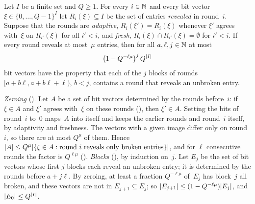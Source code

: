 \begin{lemma}\label{lem:revealing}
Let $I$ be a finite set and $Q\ge1$. For every $i\in\mathbb{N}$ and every bit vector $\xi\in\{0,\dots,Q-1\}^I$ let $R_i(\xi)\subseteq I$
be the set of entries \emph{revealed} in round~$i$. Suppose that the rounds are \emph{adaptive}, $R_i(\xi')=R_i(\xi)$ whenever
$\xi'$ agrees with~$\xi$ on $R_{i'}(\xi)$ for all $i'<i$, and \emph{fresh}, $R_i(\xi)\cap R_{i'}(\xi)=\emptyset$ for $i'<i$. If every
round reveals at most~$\mu$ entries, then for all $a,\ell,j\in\mathbb{N}$ at most
\[
  \bigl(1-Q^{-\ell\mu}\bigr)^j\,Q^{\lvert I \rvert}
\]
bit vectors have the property that each of the $j$ blocks of rounds $[a+b\ell,a+b\ell+\ell)$, $b<j$, contains a round that reveals
an unbroken entry.
\end{lemma}

\begin{outline}
\emph{Zeroing} (). Let $A$ be a set of bit vectors determined by the rounds before~$i$: if $\xi\in
A$ and $\xi'$ agrees with~$\xi$ on these rounds (), then $\xi'\in A$. Setting the bits of round~$i$ to~$0$ maps~$A$
into itself and keeps the earlier rounds and round~$i$ itself, by adaptivity and freshness. The vectors with a given image differ
only on round~$i$, so there are at most $Q^\mu$ of them. Hence $\lvert A \rvert\le Q^\mu\lvert \{\xi\in A:\text{round $i$ reveals only
broken entries}\} \rvert$, and for $\ell$ consecutive rounds the factor is $Q^{\ell\mu}$ ().
\emph{Blocks} (), by induction on~$j$. Let $E_j$ be the set of bit vectors whose first $j$ blocks each reveal
an unbroken entry; it is determined by the rounds before $a+j\ell$. By zeroing, at least a fraction $Q^{-\ell\mu}$ of~$E_j$ has
block~$j$ all broken, and these vectors are not in $E_{j+1}\subseteq E_j$; so $\lvert E_{j+1} \rvert\le(1-Q^{-\ell\mu})\lvert E_j \rvert$, and
$\lvert E_0 \rvert\le Q^{\lvert I \rvert}$.
\end{outline}


